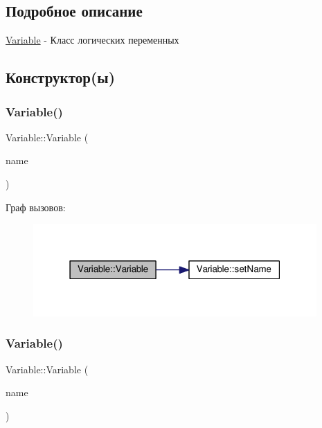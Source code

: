 \subsection{Подробное описание}
\hyperlink{class_variable}{Variable} -\/ Класс логических переменных 

\subsection{Конструктор(ы)}
\mbox{\label{class_variable_abef86be74e8dfb025fdeaf18048e9922}} 
\subsubsection{\texorpdfstring{Variable()}{Variable()}\hspace{0.1cm}{\footnotesize\ttfamily [1/4]}}
{\footnotesize\ttfamily Variable\+::\+Variable (\begin{DoxyParamCaption}\item[{const Q\+Char}]{name }\end{DoxyParamCaption})}

Граф вызовов\+:\nopagebreak
\begin{figure}[H]
\begin{center}
\leavevmode
\includegraphics[width=307pt]{class_variable_abef86be74e8dfb025fdeaf18048e9922_cgraph}
\end{center}
\end{figure}
\mbox{\label{class_variable_ae347cff8c66e1fb58b5fd90b9f19956a}} 
\subsubsection{\texorpdfstring{Variable()}{Variable()}\hspace{0.1cm}{\footnotesize\ttfamily [2/4]}}
{\footnotesize\ttfamily Variable\+::\+Variable (\begin{DoxyParamCaption}\item[{const Q\+String \&}]{name }\end{DoxyParamCaption})}

